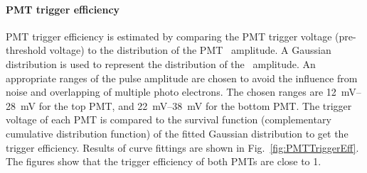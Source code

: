 \paragraph{PMT trigger efficiency}
PMT trigger efficiency is estimated by comparing the PMT trigger voltage (pre-threshold voltage) to the distribution of the PMT \sphe\ amplitude. A Gaussian distribution is used to represent the distribution of the \sphe\ amplitude. An appropriate ranges of the pulse amplitude are chosen to avoid the influence from noise and overlapping of multiple photo electrons. The chosen ranges are \SIrange{12}{28}{\mV} for the top PMT, and \SIrange{22}{38}{\mV} for the bottom PMT. The trigger voltage of each PMT is compared to the survival function (complementary cumulative distribution function) of the fitted Gaussian distribution to get the trigger efficiency. Results of curve fittings are shown in Fig.~\ref{fig:PMTTriggerEff}. The figures show that the trigger efficiency of both PMTs are close to 1.
  
